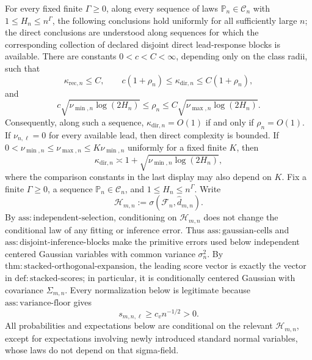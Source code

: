 For every fixed finite \(\Gamma\ge 0\), along every sequence of laws \(\mathbb P_n\in\mathcal C_n\) with \(1\le H_n\le n^\Gamma\), the following conclusions hold uniformly for all sufficiently large \(n\); the direct conclusions are understood along sequences for which the corresponding collection of declared disjoint direct lead-response blocks is available. There are constants \(0<c<C<\infty\), depending only on the class radii, such that
\[
 \kappa_{\mathrm{rec},n}\le C,
 \qquad
 c(1+\rho_n)\le \kappa_{\mathrm{dir},n}\le C(1+\rho_n),
\]
and
\[
 c\sqrt{\nu_{\min,n}\log(2H_n)}
 \le \rho_n\le
 C\sqrt{\nu_{\max,n}\log(2H_n)}.
\]
Consequently, along such a sequence, \(\kappa_{\mathrm{dir},n}=O(1)\) if and only if \(\rho_n=O(1)\). If \(\nu_{n,\ell}=0\) for every available lead, then direct complexity is bounded. If \(0<\nu_{\min,n}\le\nu_{\max,n}\le K\nu_{\min,n}\) uniformly for a fixed finite \(K\), then
\[
 \kappa_{\mathrm{dir},n}\asymp
 1+\sqrt{\nu_{\min,n}\log(2H_n)},
\]
where the comparison constants in the last display may also depend on \(K\).
Fix a finite \(\Gamma\ge0\), a sequence \(\mathbb P_n\in\mathcal C_n\), and \(1\le H_n\le n^\Gamma\).  Write
\[
 \mathcal H_{m,n}:=\sigma(\mathcal F_n,\widehat d_{m,n}).
\]
By \(\mathrm{ass{:}independent\mbox{-}selection}\), conditioning on \(\mathcal H_{m,n}\) does not change the conditional law of any fitting or inference error.  Thus \(\mathrm{ass{:}gaussian\mbox{-}cells}\) and \(\mathrm{ass{:}disjoint\mbox{-}inference\mbox{-}blocks}\) make the primitive errors used below independent centered Gaussian variables with common variance \(\sigma_n^2\).  By \(\mathrm{thm{:}stacked\mbox{-}orthogonal\mbox{-}expansion}\), the leading score vector is exactly the vector in \(\mathrm{def{:}stacked\mbox{-}scores}\); in particular, it is conditionally centered Gaussian with covariance \(\Sigma_{m,n}\).  Every normalization below is legitimate because \(\mathrm{ass{:}variance\mbox{-}floor}\) gives
\[
 s_{m,n,\ell}\ge c_v n^{-1/2}>0.
 \tag{1}
\]
All probabilities and expectations below are conditional on the relevant \(\mathcal H_{m,n}\), except for expectations involving newly introduced standard normal variables, whose laws do not depend on that sigma-field.

